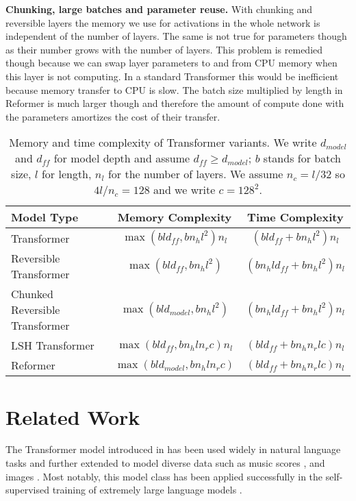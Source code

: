 \documentclass{article} \usepackage{iclr2020_conference,times}
\renewcommand{\paragraph}[1]{\textbf{#1}}
\begin{document}
\paragraph{Chunking, large batches and parameter reuse.}
With chunking and reversible layers the memory we use for activations
in the whole network is independent of the number of layers. The same is
not true for parameters though as their number grows with the number of layers. This problem is remedied though because we can swap layer
parameters to and from CPU memory when this layer is not computing.
In a standard Transformer this would be inefficient because memory
transfer to CPU is slow. The batch size multiplied by length in Reformer
is much larger though and therefore the amount of compute done with the parameters amortizes the cost of their transfer.

\begin{table}
\caption{Memory and time complexity of Transformer variants.
  We write $d_{model}$ and $d_{ff}$ for model depth and assume $d_{ff} \geq d_{model}$; $b$ stands for batch size, $l$ for length, $n_l$ for the number of layers.
  We assume $n_{c} = l/32$ so $4l/n_{c} = 128$ and we write $c = 128^2$.}
\label{tab:tcomplexity}
\begin{center}
\begin{tabular}{lcc}
Model Type & Memory Complexity & Time Complexity  \\
\hline
Transformer & $\max(bld_{ff}, bn_hl^2)n_l$ & $(bld_{ff} + bn_hl^2)n_l$ \\
Reversible Transformer & $\max(bld_{ff}, bn_hl^2)$ & $(bn_hld_{ff} + bn_hl^2)n_l$ \\
Chunked Reversible Transformer & $\max(bld_{model}, bn_hl^2)$ & $(bn_hld_{ff} + bn_hl^2)n_l$ \\
LSH Transformer & $\max(bld_{ff}, bn_hln_rc)n_l$ & $(bld_{ff} + bn_hn_rlc)n_l$ \\
Reformer & $\max(bld_{model}, bn_hln_rc)$ & $(bld_{ff} + bn_hn_rlc)n_l$ \\

\end{tabular}
\end{center}
\end{table}

\section{Related Work} \label{sec:relwork}

The Transformer model introduced in \citep{transformer} has been used
widely in natural language tasks and further extended to model diverse data such as music scores \citep{huang2018music}, 
and images \citep{parmar2018imagetransformer, ramachandran2019attentionimage}.  Most notably, this model class 
has been applied successfully in the self-supervised training of extremely large language models
\citep{devlin2018BERT, radford2019GPT2}.
\end{document}
